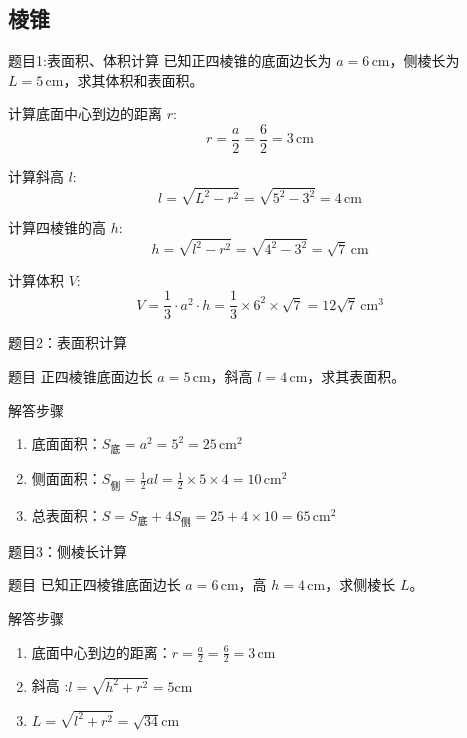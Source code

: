 
\subsection{棱锥}




\begin{frame}{题目1:表面积、体积计算}
  已知正四棱锥的底面边长为 \(a = 6 \, \text{cm}\)，侧棱长为 \(L = 5 \, \text{cm}\)，求其体积和表面积。

  \pause

  计算底面中心到边的距离 \(r\):
  \[
  r = \frac{a}{2} = \frac{6}{2} = 3 \, \text{cm}
  \]

  计算斜高 \(l\):
 \[
 l = \sqrt{L^2 - r^2} = \sqrt{5^2 - 3^2} = 4 \, \text{cm}
 \]

 计算四棱锥的高 \(h\):
 \[
 h = \sqrt{l^2 - r^2} = \sqrt{4^2 - 3^2} = \sqrt{7} \, \text{cm}
 \]

 计算体积 \(V\):
 \[
 V = \frac{1}{3} \cdot a^2 \cdot h = \frac{1}{3} \times 6^2 \times \sqrt{7} = 12\sqrt{7} \, \text{cm}^3
 \]

\end{frame}


\begin{frame}{题目2：表面积计算}
  \begin{block}{题目}
      正四棱锥底面边长 \(a = 5 \, \text{cm}\)，斜高 \(l = 4 \, \text{cm}\)，求其表面积。
  \end{block}
  
  \pause
  
  \begin{alertblock}{解答步骤}
      \begin{enumerate}
          \item 底面面积：\( S_{\text{底}} = a^2 = 5^2 = 25 \, \text{cm}^2 \)
          \item 侧面面积：\( S_{\text{侧}} = \frac{1}{2} a l = \frac{1}{2} \times 5 \times 4 = 10 \, \text{cm}^2 \)
          \item 总表面积：\( S = S_{\text{底}} + 4 S_{\text{侧}} = 25 + 4 \times 10 = 65 \, \text{cm}^2 \)
      \end{enumerate}
  \end{alertblock}
\end{frame}


\begin{frame}{题目3：侧棱长计算}
  \begin{block}{题目}
      已知正四棱锥底面边长 \(a = 6 \, \text{cm}\)，高 \(h = 4 \, \text{cm}\)，求侧棱长 \(L\)。
  \end{block}
  
  \pause
  
  \begin{alertblock}{解答步骤}
      \begin{enumerate}
          \item 底面中心到边的距离：\( r = \frac{a}{2} = \frac{6}{2} = 3 \, \text{cm} \)
          \item 斜高 :\( l = \sqrt{h^2 + r^2} = 5 \text{cm} \)
          \item $L = \sqrt{l^2 + r^2} = \sqrt{34} \text{cm} $
      \end{enumerate}
  \end{alertblock}
\end{frame}


